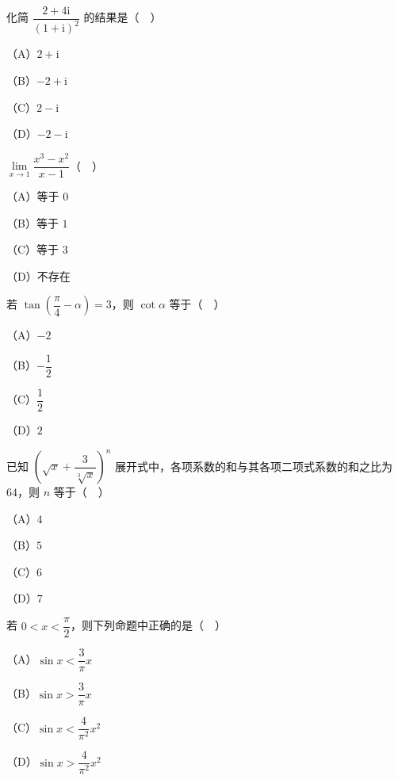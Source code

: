 


\begin{question}
化简 $\dfrac{2+4\mathrm i}{(1+\mathrm i)^2}$ 的结果是（　）

（A）$2+\mathrm i$

（B）$-2+\mathrm i$

（C）$2-\mathrm i$

（D）$-2-\mathrm i$

\end{question}
\begin{question}
$\lim\limits_{x\to1}\dfrac{x^3-x^2}{x-1}$（　）

（A）等于 $0$

（B）等于 $1$

（C）等于 $3$

（D）不存在

\end{question}
\begin{question}
若 $\tan\left(\dfrac{\pi}{4}-\alpha\right)=3$，则 $\cot\alpha$ 等于（　）

（A）$-2$

（B）$-\dfrac12$

（C）$\dfrac12$

（D）$2$

\end{question}
\begin{question}
已知 $\left(\sqrt x+\dfrac{3}{\sqrt[3]{x}}\right)^n$ 展开式中，各项系数的和与其各项二项式系数的和之比为 $64$，则 $n$ 等于（　）

（A）$4$

（B）$5$

（C）$6$

（D）$7$

\end{question}
\begin{question}
若 $0<x<\dfrac{\pi}{2}$，则下列命题中正确的是（　）

（A）$\sin x<\dfrac3\pi x$

（B）$\sin x>\dfrac3\pi x$

（C）$\sin x<\dfrac4{\pi^2}x^2$

（D）$\sin x>\dfrac4{\pi^2}x^2$

\end{question}
